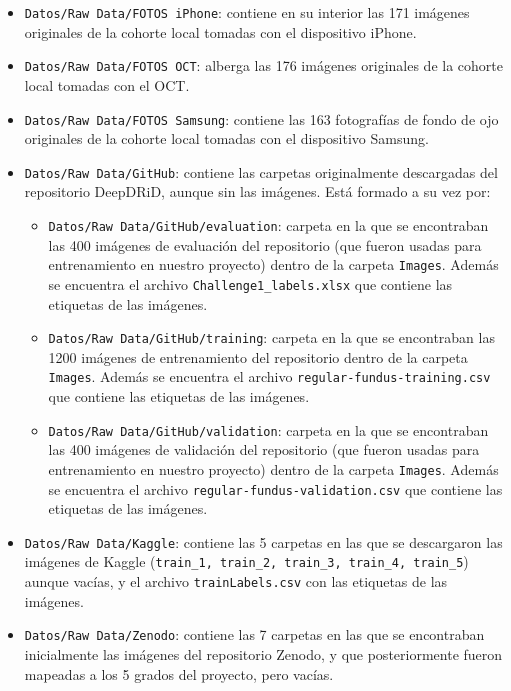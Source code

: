 \begin{itemize}
    \begin{itemize}
        \item \texttt{Datos/Raw Data/FOTOS iPhone}: contiene en su interior las 171 imágenes originales de la cohorte local tomadas con el dispositivo iPhone.
        \item \texttt{Datos/Raw Data/FOTOS OCT}: alberga las 176 imágenes originales de la cohorte local tomadas con el OCT.
        \item \texttt{Datos/Raw Data/FOTOS Samsung}: contiene las 163 fotografías de fondo de ojo originales de la cohorte local tomadas con el dispositivo Samsung.
        \item \texttt{Datos/Raw Data/GitHub}: contiene las carpetas originalmente descargadas del repositorio DeepDRiD, aunque sin las imágenes. Está formado a su vez por:
        \begin{itemize}
            \item \texttt{Datos/Raw Data/GitHub/evaluation}: carpeta en la que se encontraban las 400 imágenes de evaluación del repositorio (que fueron usadas para entrenamiento en nuestro proyecto) dentro de la carpeta \texttt{Images}. Además se encuentra el archivo \texttt{Challenge1\_labels.xlsx} que contiene las etiquetas de las imágenes.
            \item \texttt{Datos/Raw Data/GitHub/training}: carpeta en la que se encontraban las 1200 imágenes de entrenamiento del repositorio dentro de la carpeta \texttt{Images}. Además se encuentra el archivo \texttt{regular-fundus-training.csv} que contiene las etiquetas de las imágenes.
            \item \texttt{Datos/Raw Data/GitHub/validation}: carpeta en la que se encontraban las 400 imágenes de validación del repositorio (que fueron usadas para entrenamiento en nuestro proyecto) dentro de la carpeta \texttt{Images}. Además se encuentra el archivo \texttt{regular-fundus-validation.csv} que contiene las etiquetas de las imágenes.
        \end{itemize}
        \item \texttt{Datos/Raw Data/Kaggle}: contiene las 5 carpetas en las que se descargaron las imágenes de Kaggle (\texttt{train\_1, train\_2, train\_3, train\_4, train\_5}) aunque vacías, y el archivo \texttt{trainLabels.csv} con las etiquetas de las imágenes.
        \item \texttt{Datos/Raw Data/Zenodo}: contiene las 7 carpetas en las que se encontraban inicialmente las imágenes del repositorio Zenodo, y que posteriormente fueron mapeadas a los 5 grados del proyecto, pero vacías.

\end{itemize}
\end{itemize}
